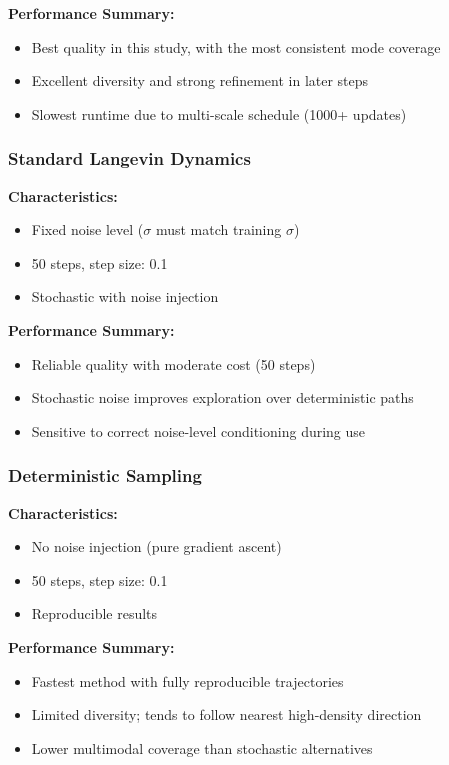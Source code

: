 \documentclass[journal]{IEEEtran}
\begin{document}
\textbf{Performance Summary:}
\begin{itemize}
    \item Best quality in this study, with the most consistent mode coverage
    \item Excellent diversity and strong refinement in later steps
    \item Slowest runtime due to multi-scale schedule (1000+ updates)
\end{itemize}

\subsubsection{Standard Langevin Dynamics}

\textbf{Characteristics:}
\begin{itemize}
    \item Fixed noise level ($\sigma$ must match training $\sigma$)
    \item 50 steps, step size: 0.1
    \item Stochastic with noise injection
\end{itemize}

\textbf{Performance Summary:}
\begin{itemize}
    \item Reliable quality with moderate cost (50 steps)
    \item Stochastic noise improves exploration over deterministic paths
    \item Sensitive to correct noise-level conditioning during use
\end{itemize}

\subsubsection{Deterministic Sampling}

\textbf{Characteristics:}
\begin{itemize}
    \item No noise injection (pure gradient ascent)
    \item 50 steps, step size: 0.1
    \item Reproducible results
\end{itemize}

\textbf{Performance Summary:}
\begin{itemize}
    \item Fastest method with fully reproducible trajectories
    \item Limited diversity; tends to follow nearest high-density direction
    \item Lower multimodal coverage than stochastic alternatives
\end{itemize}
\end{document}
